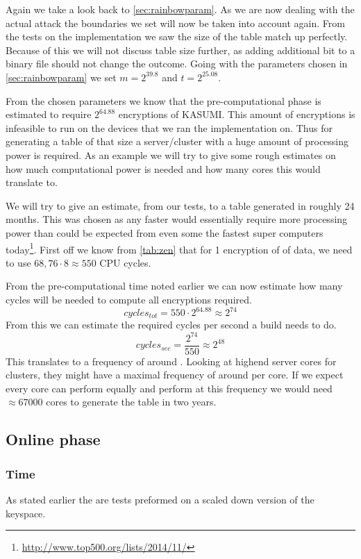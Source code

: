 Again we take a look back to \ref{sec:rainbowparam}. As we are now
dealing with the actual  attack the boundaries we set
will now be taken into account again. From the tests on the
 implementation we saw the size of the table match up
perfectly. Because of this we will not discuss table size further, as
adding additional bit to a binary file should not change the outcome.
Going with the parameters chosen in \ref{sec:rainbowparam} we set
$m=2^{39.8}$ and $t=2^{25.08}$.

From the chosen parameters we know that the pre-computational phase is
estimated to require $2^{64.88}$ encryptions of KASUMI. This amount of encryptions
is infeasible to run on the devices that we ran the
 implementation on. Thus for generating a table of that
size a server/cluster with a huge amount of processing power is
required. As an example we will try to give some rough estimates on
how much computational power is needed and how many cores this would
translate to.

We will try to give an estimate, from our tests, to a table generated
in roughly 24 months. This was chosen as any faster would essentially
require more processing power than could be expected from even some the
fastest super computers
today\footnote{\url{http://www.top500.org/lists/2014/11/}}. First off
we know from \ref{tab:zen} that for 1 encryption of
 of data, we need to use $68,76 \cdot 8 \approx 550$ CPU
cycles.

From the pre-computational time noted earlier we can now estimate how
many cycles will be needed to compute all encryptions required.
\[ cycles_{tot} = 550 \cdot 2^{64.88} \approx 2^{74}\]
From this we can estimate the required cycles per second a build needs
to do.
\[ cycles_{sec} = \frac{2^{74}}{550} \approx 2^{48}\]
This translates to a frequency of around  . Looking at
highend server cores for clusters, they might have a maximal frequency
of around per core. If we expect every core can perform
equally and perform at this frequency we would need $\approx 67000$
cores to generate the table in two years.


\subsection{Online phase}
\subsubsection{Time}
As stated earlier the are tests preformed on a scaled down version of
the keyspace.

